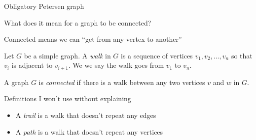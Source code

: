\documentclass{beamer}
\begin{document}
\begin{frame}{Obligatory Petersen graph}
  \begin{center}
\end{center}
\end{frame}

\begin{frame}[plain,c]

\begin{center}

\Huge

What does it mean for a graph to be connected?
\end{center}

\end{frame}


\begin{frame}{Connected means we can ``get from any vertex to another''}
  \begin{definition}[Walk] Let $G$ be a simple graph.  A \emph{walk} in $G$ is a sequence of vertices $v_1, v_2, \dots, v_n$ so that $v_i$ is adjacent to $v_{i+1}$.  We we say the walk goes from $v_1$ to $v_n$.
    \end{definition}

  \begin{definition}[Connected] A graph $G$ is \emph{connected} if there is a walk between any two vertices $v$ and $w$ in $G$.
  \end{definition}

  \begin{block}{Definitions I won't use without explaining}
    \begin{itemize}
    \item A \emph{trail} is a walk that doesn't repeat any edges
    \item A \emph{path} is a walk that doesn't repeat any vertices
    \end{itemize}
    \end{block}

\end{frame}
  
\end{document}
